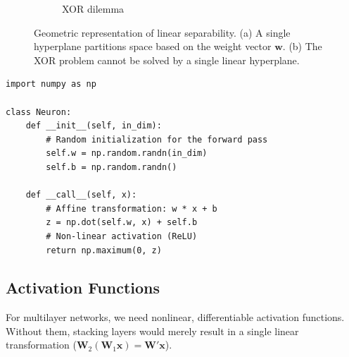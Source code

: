 \documentclass{tufte-handout}
\begin{document}
\begin{figure}[htbp]
\begin{subfigure}{0.48\textwidth}
    \caption{XOR dilemma}
    \label{fig:xor_problem}
\end{subfigure}
\caption{Geometric representation of linear separability. (a) A single hyperplane partitions space based on the weight vector $\mathbf{w}$. (b) The XOR problem cannot be solved by a single linear hyperplane.}
\label{fig:linear_vs_xor}
\end{figure}

\begin{lstlisting}[caption={Implementing the Neuron class in \texttt{mini\_nn/primitives.py}.}]
import numpy as np

class Neuron:
    def __init__(self, in_dim):
        # Random initialization for the forward pass
        self.w = np.random.randn(in_dim)
        self.b = np.random.randn()
        
    def __call__(self, x):
        # Affine transformation: w * x + b
        z = np.dot(self.w, x) + self.b
        # Non-linear activation (ReLU)
        return np.maximum(0, z)
\end{lstlisting}

\subsection{Activation Functions}

For multilayer networks, we need nonlinear, differentiable activation functions. Without them, stacking layers would merely result in a single linear transformation ($\mathbf{W}_2(\mathbf{W}_1\mathbf{x}) = \mathbf{W}'\mathbf{x}$). 
\end{document}

